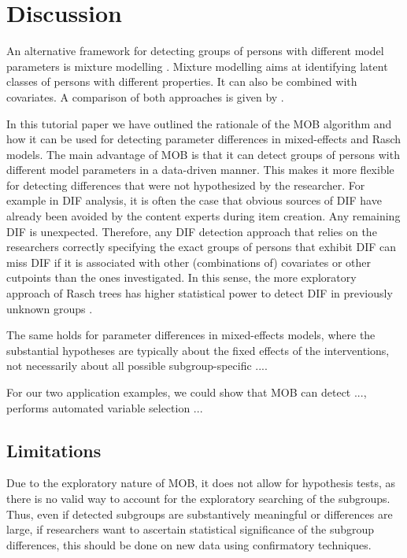 \documentclass[doc,floatsintext,natbib]{apa7}
\begin{document}
\FloatBarrier
\section{Discussion}

An alternative framework for detecting groups of persons with different model parameters is mixture modelling \citep[see, e.g.,][in the context of Rasch modelling]{AyalySant17,FriStrZei:2015:EaPM}. Mixture modelling aims at identifying latent classes of persons with different properties. It can also be combined with covariates. A comparison of both approaches is given by \citet{FriStrZei:2014}.

In this tutorial paper we have outlined the rationale of the MOB algorithm and how it can be used for detecting parameter differences in mixed-effects and Rasch models. The main advantage of MOB is that it can detect groups of persons with different model parameters in a data-driven manner. This makes it more flexible for detecting differences that were not hypothesized by the researcher. For example in DIF analysis, it is often the case that obvious sources of DIF have already been avoided by the content experts during item creation. Any remaining DIF is unexpected. Therefore, any DIF detection approach that relies on the researchers correctly specifying the exact groups of persons that exhibit DIF can miss DIF if it is associated with other (combinations of) covariates or other cutpoints than the ones investigated. In this sense, the more exploratory approach of Rasch trees has higher statistical power to detect DIF in previously unknown groups \citep{StrKopZei:2015:P}. 

The same holds for parameter differences in mixed-effects models, where the substantial hypotheses are typically about the fixed effects of the interventions, not necessarily about all possible subgroup-specific .... 


For our two application examples, we could show that MOB can detect ..., performs automated variable selection ...



\subsection{Limitations}

Due to the exploratory nature of MOB, it does not allow for hypothesis tests, as there is no valid way to account for the exploratory searching of the subgroups. Thus, even if detected subgroups are substantively meaningful or differences are large, if researchers want to ascertain statistical significance of the subgroup differences, this should be done on new data using confirmatory techniques.
\end{document}
